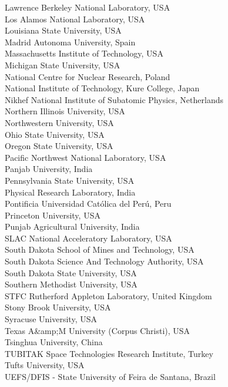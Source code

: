 \begin{center}
Lawrence Berkeley National Laboratory, USA \\
Los Alamos National Laboratory, USA \\
Louisiana State University, USA \\
Madrid Autonoma University, Spain \\
Massachusetts Institute of Technology, USA \\
Michigan State University, USA \\
National Centre for Nuclear Research, Poland \\
National Institute of Technology, Kure College, Japan \\
Nikhef National Institute of Subatomic Physics, Netherlands \\
Northern Illinois University, USA \\
Northwestern University, USA \\
Ohio State University, USA \\
Oregon State University, USA \\
Pacific Northwest National Laboratory, USA \\
Panjab University, India \\
Pennsylvania State University, USA \\
Physical Research Laboratory, India \\
Pontificia Universidad Católica del Perú, Peru \\
Princeton University, USA \\
Punjab Agricultural University, India \\
SLAC National Acceleratory Laboratory, USA \\
South Dakota School of Mines and Technology, USA \\
South Dakota Science And Technology Authority, USA \\
South Dakota State University, USA \\
Southern Methodist University, USA \\
STFC Rutherford Appleton Laboratory, United Kingdom \\
Stony Brook University, USA \\
Syracuse University, USA \\
Texas A\&amp;M University  (Corpus Christi), USA \\
Tsinghua University, China \\
TUBITAK Space Technologies Research Institute, Turkey \\
Tufts University, USA \\
UEFS/DFIS - State University of Feira de Santana, Brazil \\

\end{center}
